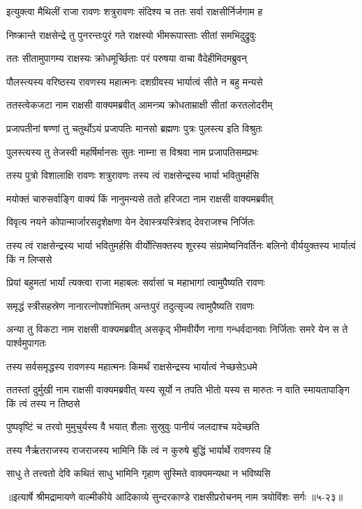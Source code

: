 
\twolineshloka
{इत्युक्त्वा मैथिलीं राजा रावणः शत्रुरावणः}
{संदिश्य च ततः सर्वा राक्षसीर्निर्जगाम ह} %

\twolineshloka
{निष्क्रान्ते राक्षसेन्द्रे तु पुनरन्तःपुरं गते}
{राक्षस्यो भीमरूपास्ताः सीतां समभिदुद्रुवुः} %

\twolineshloka
{ततः सीतामुपागम्य राक्षस्यः क्रोधमूर्च्छिताः}
{परं परुषया वाचा वैदेहीमिदमब्रुवन्} %

\twolineshloka
{पौलस्त्यस्य वरिष्ठस्य रावणस्य महात्मनः}
{दशग्रीवस्य भार्यात्वं सीते न बहु मन्यसे} %

\twolineshloka
{ततस्त्वेकजटा नाम राक्षसी वाक्यमब्रवीत्}
{आमन्त्र्य क्रोधताम्राक्षी सीतां करतलोदरीम्} %

\twolineshloka
{प्रजापतीनां षण्णां तु चतुर्थोऽयं प्रजापतिः}
{मानसो ब्रह्मणः पुत्रः पुलस्त्य इति विश्रुतः} %

\twolineshloka
{पुलस्त्यस्य तु तेजस्वी महर्षिर्मानसः सुतः}
{नाम्ना स विश्रवा नाम प्रजापतिसमप्रभः} %

\twolineshloka
{तस्य पुत्रो विशालाक्षि रावणः शत्रुरावणः}
{तस्य त्वं राक्षसेन्द्रस्य भार्या भवितुमर्हसि} %

\twolineshloka
{मयोक्तं चारुसर्वाङ्गि वाक्यं किं नानुमन्यसे}
{ततो हरिजटा नाम राक्षसी वाक्यमब्रवीत्} %

\twolineshloka
{विवृत्य नयने कोपान्मार्जारसदृशेक्षणा}
{येन देवास्त्रयस्त्रिंशद् देवराजश्च निर्जितः} %

\threelineshloka
{तस्य त्वं राक्षसेन्द्रस्य भार्या भवितुमर्हसि}
{वीर्योत्सिक्तस्य शूरस्य संग्रामेष्वनिवर्तिनः}
{बलिनो वीर्ययुक्तस्य भार्यात्वं किं न लिप्ससे} %

\twolineshloka
{प्रियां बहुमतां भार्यां त्यक्त्वा राजा महाबलः}
{सर्वासां च महाभागां त्वामुपैष्यति रावणः} %

\twolineshloka
{समृद्धं स्त्रीसहस्रेण नानारत्नोपशोभितम्}
{अन्तःपुरं तदुत्सृज्य त्वामुपैष्यति रावणः} %

\threelineshloka
{अन्या तु विकटा नाम राक्षसी वाक्यमब्रवीत्}
{असकृद् भीमवीर्येण नागा गन्धर्वदानवाः}
{निर्जिताः समरे येन स ते पार्श्वमुपागतः} %

\twolineshloka
{तस्य सर्वसमृद्धस्य रावणस्य महात्मनः}
{किमर्थं राक्षसेन्द्रस्य भार्यात्वं नेच्छसेऽधमे} %

\threelineshloka
{ततस्तां दुर्मुखी नाम राक्षसी वाक्यमब्रवीत्}
{यस्य सूर्यो न तपति भीतो यस्य स मारुतः}
{न वाति स्मायतापाङ्गि किं त्वं तस्य न तिष्ठसे} %

\twolineshloka
{पुष्पवृष्टिं च तरवो मुमुचुर्यस्य वै भयात्}
{शैलाः सुस्रुवुः पानीयं जलदाश्च यदेच्छति} %

\twolineshloka
{तस्य नैर्ऋतराजस्य राजराजस्य भामिनि}
{किं त्वं न कुरुषे बुद्धिं भार्यार्थे रावणस्य हि} %

\twolineshloka
{साधु ते तत्त्वतो देवि कथितं साधु भामिनि}
{गृहाण सुस्मिते वाक्यमन्यथा न भविष्यसि} %


॥इत्यार्षे श्रीमद्रामायणे वाल्मीकीये आदिकाव्ये सुन्दरकाण्डे राक्षसीप्ररोचनम् नाम त्रयोविंशः सर्गः ॥५-२३॥
